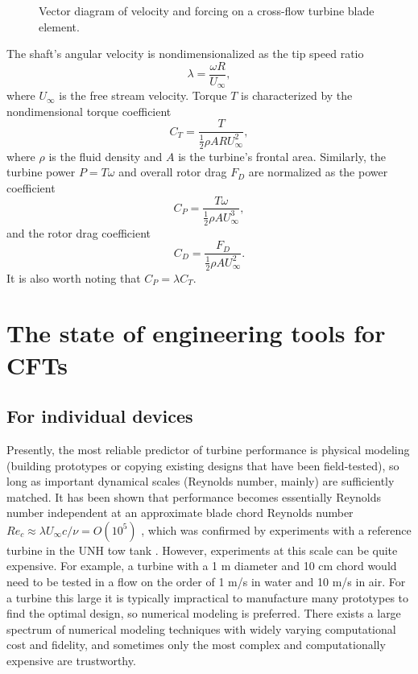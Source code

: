 \begin{figure}[ht]
\caption{Vector diagram of velocity and forcing on a cross-flow turbine blade
element.}
\label{fig:vectors}
\end{figure}

The shaft's angular velocity is nondimensionalized as the tip speed ratio
\begin{equation}
\lambda = \frac{\omega R}{U_\infty},
\label{eq:lambda}
\end{equation}
where $U_\infty$ is the free stream velocity.
Torque $T$ is characterized by the nondimensional torque coefficient 
\begin{equation}
C_T = \frac{T}{\frac{1}{2} \rho A R U_\infty^2},
\label{eq:ct}
\end{equation}
where $\rho$ is the fluid density and $A$ is the turbine's frontal area.
Similarly, the turbine power $P = T\omega$ and overall rotor drag $F_D$ are
normalized as the power coefficient
\begin{equation}
C_P = \frac{T \omega}{\frac{1}{2} \rho A U_\infty^3},
\label{eq:cp}
\end{equation}
and the rotor drag coefficient
\begin{equation}
C_D = \frac{F_D}{\frac{1}{2} \rho A U_\infty^2}.
\label{eq:cd}
\end{equation}
It is also worth noting that $C_P = \lambda C_T$.

\section{The state of engineering tools for CFTs}

\subsection{For individual devices}

Presently, the most reliable predictor of turbine performance is physical
modeling (building prototypes or copying existing designs that have been
field-tested), so long as important dynamical scales (Reynolds number, mainly)
are sufficiently matched. It has been shown that performance becomes essentially
Reynolds number independent at an approximate blade chord Reynolds number $Re_c
\approx \lambda U_\infty c / \nu = O(10^5)$ \cite{Bravo2007}, which was
confirmed by experiments with a reference turbine in the UNH tow tank
\cite{Bachant2014}. However, experiments at this scale can be quite expensive.
For example, a turbine with a 1 m diameter and 10 cm chord would need to be
tested in a flow on the order of 1 m/s in water and 10 m/s in air. For a turbine
this large it is typically impractical to manufacture many prototypes to find
the optimal design, so numerical modeling is preferred. There exists a large
spectrum of numerical modeling techniques with widely varying computational cost
and fidelity, and sometimes only the most complex and computationally expensive
are trustworthy.

